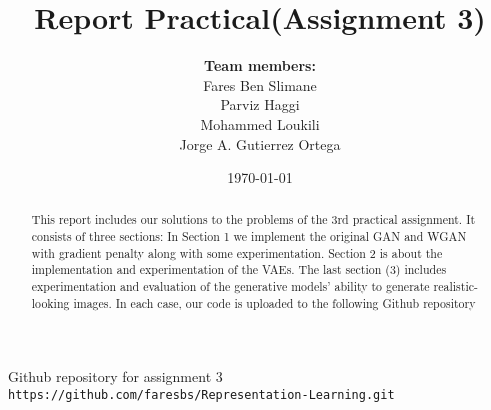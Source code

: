 \documentclass[a4paper]{article}
\title{Report Practical(Assignment 3)}
\author{\textbf{Team members:}\\
Fares Ben Slimane \\
Parviz Haggi \\
Mohammed Loukili \\
Jorge A. Gutierrez Ortega
}
\date{\today}
\begin{document}
\maketitle

\begin{abstract}
This report includes our solutions to the problems of the 3rd practical assignment. It consists of three sections: In Section 1 we implement the original GAN and WGAN with gradient penalty along with some experimentation. Section 2 is about the implementation and experimentation of the VAEs. The last section (3) includes experimentation and evaluation of the generative models' ability to generate realistic-looking images. In each case, our code is uploaded to the following Github repository \cite{github}
\end{abstract}







 \newpage
\begin{thebibliography}{9}
  Github repository for assignment 3
  \\\texttt{https://github.com/faresbs/Representation-Learning.git}

  
  
\end{thebibliography}
\end{document}
